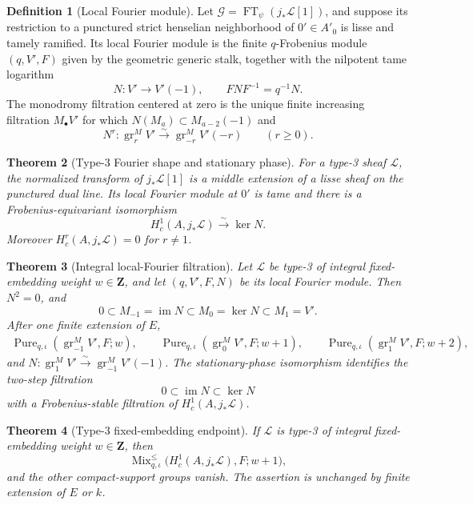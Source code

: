 \documentclass[10pt]{article}
\newtheorem{theorem}{Theorem}[section]
\theoremstyle{definition}
\newtheorem{definition}[theorem]{Definition}
\newcommand{\MixLe}{\operatorname{Mix}^{\leq}}
\newcommand{\Pure}{\operatorname{Pure}}
\newcommand{\gr}{\operatorname{gr}}
\begin{document}
\begin{definition}[Local Fourier module]
Let \(\mathcal G=\operatorname{FT}_\psi(j_*\mathcal L[1])\), and suppose
its restriction to a punctured strict henselian neighborhood of
\(0'\in A'_0\) is lisse and tamely ramified.  Its local Fourier module is
the finite \(q\)-Frobenius module \((q,V',F)\) given by the geometric
generic stalk, together with the nilpotent tame logarithm
\[
               N:V'\longrightarrow V'(-1),
 \qquad FNF^{-1}=q^{-1}N.
\]
The monodromy filtration centered at zero is the unique finite increasing
filtration \(M_\bullet V'\) for which
\(N(M_a)\subset M_{a-2}(-1)\) and
\[
 N^r:\gr_r^MV'\xrightarrow{\sim}\gr_{-r}^MV'(-r)
 \qquad(r\ge0).
\]
\end{definition}

\begin{theorem}[Type-3 Fourier shape and stationary phase]
For a type-3 sheaf \(\mathcal L\), the normalized transform of
\(j_*\mathcal L[1]\) is a middle extension of a lisse sheaf on the
punctured dual line.  Its local Fourier module at \(0'\) is tame and there
is a Frobenius-equivariant isomorphism
\[
              H_c^1(A,j_*\mathcal L)\xrightarrow{\sim}\ker N.
\]
Moreover \(H_c^r(A,j_*\mathcal L)=0\) for \(r\ne1\).
\end{theorem}

\begin{theorem}[Integral local-Fourier filtration]
Let \(\mathcal L\) be type-3 of integral fixed-embedding weight
\(w\in\mathbf Z\), and let \((q,V',F,N)\) be its local Fourier module.
Then \(N^2=0\), and
\[
 0\subset M_{-1}=\operatorname{im}N
 \subset M_0=\ker N\subset M_1=V'.
\]
After one finite extension of \(E\),
\begin{align*}
 \Pure_{q,\iota}(\gr_{-1}^MV',F;w),\qquad
 \Pure_{q,\iota}(\gr_0^MV',F;w+1),\qquad
 \Pure_{q,\iota}(\gr_1^MV',F;w+2),
\end{align*}
and
\(N:\gr_1^MV'\xrightarrow{\sim}\gr_{-1}^MV'(-1)\).
The stationary-phase isomorphism identifies the two-step filtration
\[
 0\subset\operatorname{im}N\subset\ker N
\]
with a Frobenius-stable filtration of
\(H_c^1(A,j_*\mathcal L)\).
\end{theorem}

\begin{theorem}[Type-3 fixed-embedding endpoint]
If \(\mathcal L\) is type-3 of integral fixed-embedding weight
\(w\in\mathbf Z\), then
\[
 \MixLe_{q,\iota}
 \bigl(H_c^1(A,j_*\mathcal L),F;w+1\bigr),
\]
and the other compact-support groups vanish.  The assertion is unchanged by
finite extension of \(E\) or \(k\).
\end{theorem}
\end{document}
